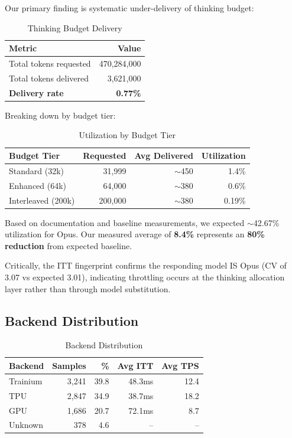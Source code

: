 \documentclass[11pt,a4paper]{article}
\begin{document}
Our primary finding is systematic under-delivery of thinking budget:

\begin{table}[H]
\centering
\caption{Thinking Budget Delivery}
\begin{tabular}{lr}
\toprule
Metric & Value \\
\midrule
Total tokens requested & 470,284,000 \\
Total tokens delivered & 3,621,000 \\
\textbf{Delivery rate} & \textbf{0.77\%} \\
\bottomrule
\end{tabular}
\end{table}

Breaking down by budget tier:

\begin{table}[H]
\centering
\caption{Utilization by Budget Tier}
\begin{tabular}{lrrr}
\toprule
Budget Tier & Requested & Avg Delivered & Utilization \\
\midrule
Standard (32k) & 31,999 & $\sim$450 & 1.4\% \\
Enhanced (64k) & 64,000 & $\sim$380 & 0.6\% \\
Interleaved (200k) & 200,000 & $\sim$380 & 0.19\% \\
\bottomrule
\end{tabular}
\end{table}

Based on documentation and baseline measurements, we expected $\sim$42.67\% utilization for Opus. Our measured average of \textbf{8.4\%} represents an \textbf{80\% reduction} from expected baseline.

Critically, the ITT fingerprint confirms the responding model IS Opus (CV of 3.07 vs expected 3.01), indicating throttling occurs at the thinking allocation layer rather than through model substitution.

\subsection{Backend Distribution}

\begin{table}[H]
\centering
\caption{Backend Distribution}
\begin{tabular}{lrrrr}
\toprule
Backend & Samples & \% & Avg ITT & Avg TPS \\
\midrule
Trainium & 3,241 & 39.8 & 48.3ms & 12.4 \\
TPU & 2,847 & 34.9 & 38.7ms & 18.2 \\
GPU & 1,686 & 20.7 & 72.1ms & 8.7 \\
Unknown & 378 & 4.6 & -- & -- \\
\bottomrule
\end{tabular}
\end{table}
\end{document}
